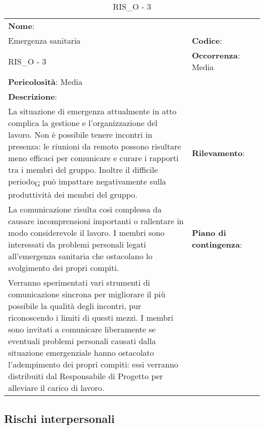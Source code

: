 \renewcommand{\arraystretch}{1.5}
\begin{longtable} { 
		>{\raggedright}p{} 
		>{\raggedright}p{} 
		>{\raggedright}p{}    }
	
	\caption{RIS\_O - 3} \endhead	
	
	
	\textbf{Nome}: \\ Emergenza sanitaria
	& \textbf{Codice}: \\ RIS\_O - 3
	& \textbf{Occorrenza}: Media \\ \textbf{Pericolosità}: Media
	
	\tabularnewline
	
	\textbf{Descrizione}: \\ La situazione di emergenza attualmente in atto complica la gestione e l'organizzazione del lavoro. Non è possibile tenere incontri in presenza: le riunioni da remoto possono risultare meno efficaci per comunicare e curare i rapporti tra i membri del gruppo. Inoltre il difficile \gls{periodo}\textsubscript{G} può impattare negativamente sulla produttività dei membri del gruppo.
	&
	\textbf{Rilevamento}: \\ La comunicazione risulta così complessa da causare incomprensioni importanti o rallentare in modo considerevole il lavoro. I membri sono interessati da problemi personali legati all'emergenza sanitaria che ostacolano lo svolgimento dei propri compiti.
	& 
	\textbf{Piano di contingenza}: \\ Verranno sperimentati vari strumenti di comunicazione sincrona per migliorare il più possibile la qualità degli incontri, pur riconoscendo i limiti di questi mezzi. I membri sono invitati a comunicare liberamente se eventuali problemi personali causati dalla situazione emergenziale hanno ostacolato l'adempimento dei propri compiti: essi verranno distribuiti dal Responsabile di Progetto per alleviare il carico di lavoro.

	
\end{longtable}



\subsection{Rischi interpersonali}




